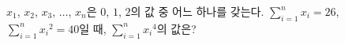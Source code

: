 $x_1$, $x_2$, $x_3$, $\ldots$, $x_n$은 $0$, $1$, $2$의 값 중 어느 하나를 갖는다. $\displaystyle\sum_{i=1}^{n} x_i=26$, $\displaystyle\sum_{i=1}^{n} {x_i}^2=40$일 때, $\displaystyle\sum_{i=1}^{n} {x_i}^4$의 값은?
